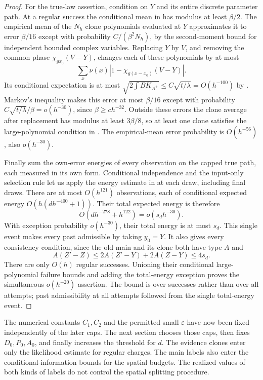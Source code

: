 \begin{proof}
For the true-law assertion, condition on $Y$ and its entire discrete
parameter path.  At a regular success the conditional mean in
 has modulus at least $\beta/2$.  The
empirical mean of the $N_h$ clone polynomials evaluated at $Y$
approximates it to error $\beta/16$ except with probability
$C/(\beta^2N_h)$, by the second-moment bound for independent bounded
complex variables.  Replacing $Y$ by $V$, and removing the common
phase $\chi_{gx_0}(V-Y)$, changes each of these polynomials by at most
\[
 \sum_x\nu(x)|1-\chi_{g(x-x_0)}(V-Y)|.
\]
Its conditional expectation is at most
$\sqrt{2\int BK_{A^+}}\le C\sqrt{t/\lambda}=O(h^{-100})$
by .  Markov's inequality makes this error at most
$\beta/16$ except with probability
$C\sqrt{t/\lambda}/\beta=o(h^{-30})$, since
$\beta\ge ch^{-32}$.  Outside these errors the clone average after
replacement has modulus at least $3\beta/8$, so at least one clone
satisfies the large-polynomial condition in .
The empirical-mean error probability is $O(h^{-56})$, also
$o(h^{-30})$.

Finally sum the own-error energies of every observation on the capped
true path, each measured in its own form.  Conditional independence
and the input-only selection rule let us apply the energy estimate in
 at each draw, including final draws.  There are at
most $O(h^{121})$ observations, each of conditional expected energy
$O(h(dh^{-400}+1))$.  Their total expected energy is therefore
\[
 O(dh^{-278}+h^{122})=o(s_dh^{-30}).
\]
With exception probability $o(h^{-30})$, their total energy is at
most $s_d$.  This single event makes every past admissible by taking
$y_0=Y$.  It also gives every consistency condition, since the old
main and its clone both have type $A$ and
\[
 A(Z'-Z)\le2A(Z'-Y)+2A(Z-Y)\le4s_d.
\]
There are only $O(h)$ regular successes.  Unioning their conditional
large-polynomial failure bounds and adding the total-energy exception
proves the simultaneous $o(h^{-20})$ assertion.  The bound is over
successes rather than over all attempts; past admissibility at all
attempts followed from the single total-energy event.
\end{proof}

The numerical constants $C_1,C_2$ and the permitted small
$\varepsilon$ have now been fixed independently of the later caps.
The next section chooses those caps, then fixes $D_0,P_0,A_0$, and
finally increases the threshold for $d$. The evidence clones enter only
the likelihood estimate for regular charges. The main labels also enter
the conditional-information bounds for the spatial budgets. The realized
values of both kinds of labels do not control the spatial splitting procedure.
